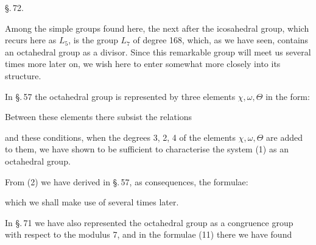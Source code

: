 
\begin{center}
\S.\,72.

\end{center}

Among the simple groups found here, the next after the icosahedral group, which recurs here as $L_5$, is the group $L_7$ of degree 168, which, as we have seen, contains an octahedral group as a divisor. Since this remarkable group will meet us several times more later on, we wish here to enter somewhat more closely into its structure.

In \S.\,57 the octahedral group is represented by three elements $\chi, \omega, \Theta$ in the form:


Between these elements there subsist the relations


and these conditions, when the degrees 3, 2, 4 of the elements $\chi, \omega, \Theta$ are added to them, we have shown to be sufficient to characterise the system (1) as an octahedral group.

From (2) we have derived in \S.\,57, as consequences, the formulae:


which we shall make use of several times later.

In \S.\,71 we have also represented the octahedral group as a congruence group with respect to the modulus 7, and in the formulae (11) there we have found


